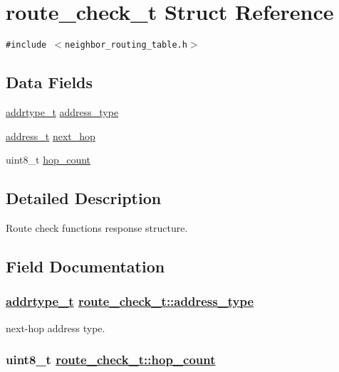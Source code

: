 \hypertarget{structroute__check__t}{
\section{route\_\-check\_\-t Struct Reference}
\label{structroute__check__t}
}
{\tt \#include $<$neighbor\_\-routing\_\-table.h$>$}

\subsection*{Data Fields}
\begin{CompactItemize}
\item 
\hyperlink{address_8h_faf76b5591da0abd0584dec411d0551d}{addrtype\_\-t} \hyperlink{structroute__check__t_340f22861b8c93d6b975d22d5b009302}{address\_\-type}
\item 
\hyperlink{address_8h_65ce5a1faf29ab669a1d3dc6ce26c2ab}{address\_\-t} \hyperlink{structroute__check__t_9bac5aab9dc6d8ff6209bbf6b8c7a75d}{next\_\-hop}
\item 
uint8\_\-t \hyperlink{structroute__check__t_b0c86ee96d76aa0b4de637e3eea1c831}{hop\_\-count}
\end{CompactItemize}


\subsection{Detailed Description}
Route check functions response structure. 



\subsection{Field Documentation}
\hypertarget{structroute__check__t_340f22861b8c93d6b975d22d5b009302}{
\subsubsection[address\_\-type]{\setlength{\rightskip}{0pt plus 5cm}\hyperlink{address_8h_faf76b5591da0abd0584dec411d0551d}{addrtype\_\-t} \hyperlink{structroute__check__t_340f22861b8c93d6b975d22d5b009302}{route\_\-check\_\-t::address\_\-type}}}
\label{structroute__check__t_340f22861b8c93d6b975d22d5b009302}


next-hop address type. \hypertarget{structroute__check__t_b0c86ee96d76aa0b4de637e3eea1c831}{
\subsubsection[hop\_\-count]{\setlength{\rightskip}{0pt plus 5cm}uint8\_\-t \hyperlink{structroute__check__t_b0c86ee96d76aa0b4de637e3eea1c831}{route\_\-check\_\-t::hop\_\-count}}}
\label{structroute__check__t_b0c86ee96d76aa0b4de637e3eea1c831}


